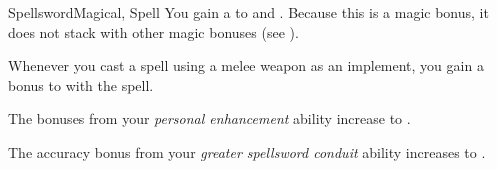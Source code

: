 \begin{feat}{Spellsword}{Magical, Spell}
         You gain a   to  and .
        Because this is a magic bonus, it does not stack with other magic bonuses (see ).

         Whenever you cast a spell using a melee weapon as an implement, you gain a  bonus to  with the spell.

         The bonuses from your \textit{personal enhancement} ability increase to .

         The accuracy bonus from your \textit{greater spellsword conduit} ability increases to .
    \end{feat}

